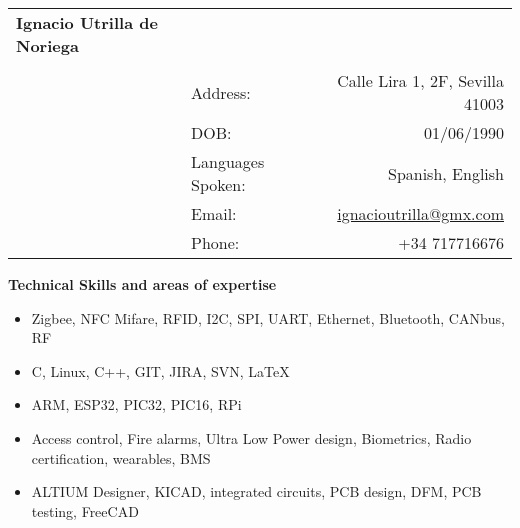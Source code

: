 \documentclass[9pt]{extarticle}
\begin{document}
\begin{table}
\centering{}
\begin{tabularx}{\textwidth}{lXlr}\\
\textbf{\huge{Ignacio Utrilla de Noriega}}&&&\\\cline{1-4}
& & & \\
&        &    Address:          &   Calle Lira 1, 2F, Sevilla 41003\\
&        &    DOB:              &   01/06/1990\\
&        &    Languages Spoken: &   Spanish, English\\
&        &    Email:            &   \href{mailto:ignacioutrilla@gmx.com}{ignacioutrilla@gmx.com}    \\
&        &    Phone:            &   +34 717716676\\
\end{tabularx}
\end{table}

\textbf{Technical Skills and areas of expertise}\\\linea
\begin{itemize}
    \item{Zigbee, NFC Mifare, RFID, I2C, SPI, UART, Ethernet, Bluetooth, CANbus, RF}
    \item{C, Linux, C++, GIT, JIRA, SVN, \LaTeX}
    \item{ARM, ESP32, PIC32, PIC16, RPi}
    \item{Access control, Fire alarms, Ultra Low Power design, Biometrics, Radio certification, wearables, BMS}
    \item{ALTIUM Designer, KICAD, integrated circuits, PCB design, DFM, PCB testing, FreeCAD}
\end{itemize}
\vspace{1cm}
\end{document}
